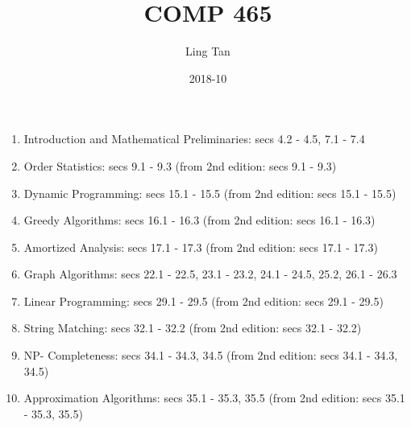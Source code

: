 \documentclass[a4paper]{article}
\title{COMP 465}
\date{2018-10}
\author{Ling Tan}
\begin{document}
\maketitle

\begin{enumerate}
    \item Introduction and Mathematical Preliminaries: secs 4.2 - 4.5, 7.1 - 7.4 \item Order Statistics: secs 9.1 - 9.3 (from 2nd edition: secs 9.1 - 9.3)
    \item Dynamic Programming: secs 15.1 - 15.5 (from 2nd edition: secs 15.1 - 15.5)
    \item Greedy Algorithms: secs 16.1 - 16.3 (from 2nd edition: secs 16.1 - 16.3)
    \item Amortized Analysis: secs 17.1 - 17.3 (from 2nd edition: secs 17.1 - 17.3)
    \item Graph Algorithms: secs 22.1 - 22.5, 23.1 - 23.2, 24.1 - 24.5, 25.2, 26.1 - 26.3
    \item Linear Programming: secs 29.1 - 29.5 (from 2nd edition: secs 29.1 - 29.5)
    \item String Matching: secs 32.1 - 32.2 (from 2nd edition: secs 32.1 - 32.2)
    \item NP- Completeness: secs 34.1 - 34.3, 34.5 (from 2nd edition: secs 34.1 - 34.3, 34.5)
    \item Approximation Algorithms: secs 35.1 - 35.3, 35.5 (from 2nd edition: secs 35.1 - 35.3, 35.5)
\end{enumerate}
\end{document}
